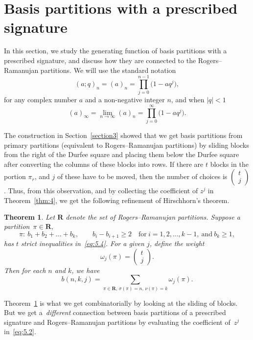 \documentclass[pdftex]{sigma}
\numberwithin{equation}{section}
\newtheorem{Theorem}{Theorem}[section]
\theoremstyle{definition}
\newcommand{\bin}[2]{\left(\begin{matrix} #1 \\ #2 \end{matrix} \right)}
\begin{document}
\section{Basis partitions with a prescribed signature}\label{section7}

In this section, we study the generating function of basis partitions
with a prescribed signature, and discuss how they are connected to
the Rogers--Ramanujan partitions. We will use the standard notation
\[
(a;q)_n=(a)_n=\prod^{n-1}_{j=0}\bigl(1-aq^j\bigr),
\]
for any complex number $a$ and a non-negative integer $n$, and when $|q|<1$
\[
(a)_{\infty}=\lim_{n\to\infty}(a)_n=\prod^{\infty}_{j=0}\bigl(1-aq^j\bigr).
\]

The construction in Section~\ref{section3} showed that we get basis partitions
from primary partitions (equivalent to Rogers--Ramanujan partitions)
by sliding blocks from the right of the Durfee square and placing them
below the Durfee square after converting the columns of these blocks
into rows. If there are $t$ blocks in the portion $\pi_r$, and $j$ of
these have to be moved, then the number of choices is
$\left(\begin{smallmatrix} t\\ j\end{smallmatrix}\right)$.
Thus, from this observation, and by collecting the coefficient of $z^j$
in Theorem~\ref{thm:4}, we get the following refinement of Hirschhorn's theorem.

\begin{Theorem}\label{thm:5}
Let $\mathbf{R}$ denote the set of Rogers--Ramanujan partitions.
Suppose a partition~${\pi\!\in\! \mathbf{R}}$,
\begin{equation*}
\pi\colon\ b_1+b_2+\dots +b_k, \qquad b_i-b_{i+1}\ge 2 \quad \text{for} \
i=1,2,\dots , k-1, \ \text{and} \ b_k\ge 1,%
\end{equation*}
has $t$ strict inequalities in~\eqref{eq:5.4}. For a given $j$, define the weight
\[
\omega_j(\pi)=\bin{t}{j}.
\]
Then for each $n$ and $k$, we have
\[
b(n,k,j)=\sum_{\pi\in \mathbf{R},\, \sigma(\pi)=n,\, \nu(\pi)=k}\omega_j(\pi).
\]
\end{Theorem}

Theorem~\ref{thm:5} is what we get combinatorially by looking at the sliding
of blocks. But we get a~{\it different} connection between
basis partitions of a prescribed signature and Rogers--Ramanujan partitions
by evaluating the coefficient of~$z^j$ in~\eqref{eq:5.2}.
\end{document}
